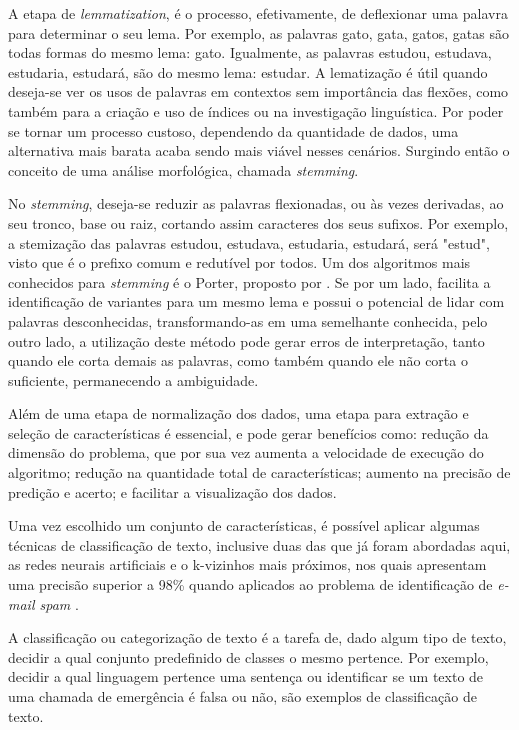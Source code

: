 A etapa de \textit{lemmatization}, é o processo, efetivamente, de deflexionar uma palavra para determinar o seu lema. Por exemplo, as palavras gato, gata, gatos, gatas são todas formas do mesmo lema: gato. Igualmente, as palavras estudou, estudava, estudaria, estudará, são do mesmo lema: estudar. A lematização é útil quando deseja-se ver os usos de palavras em contextos sem importância das flexões, como também para a criação e uso de índices ou na investigação linguística. Por poder se tornar um processo custoso, dependendo da quantidade de dados, uma alternativa mais barata acaba sendo mais viável nesses cenários. Surgindo então o conceito de uma análise morfológica, chamada \textit{stemming}.

No \textit{stemming}, deseja-se reduzir as palavras flexionadas, ou às vezes derivadas, ao seu tronco, base ou raiz, cortando assim caracteres dos seus sufixos. Por exemplo, a stemização das palavras estudou, estudava, estudaria, estudará, será "estud", visto que é o prefixo comum e redutível por todos. Um dos algoritmos mais conhecidos para \textit{stemming} é o Porter, proposto por \citep{porter1980algorithm}. Se por um lado, facilita a identificação de variantes para um mesmo lema e possui o potencial de lidar com palavras desconhecidas, transformando-as em uma semelhante conhecida, pelo outro lado, a utilização deste método pode gerar erros de interpretação, tanto quando ele corta demais as palavras, como também quando ele não corta o suficiente, permanecendo a ambiguidade.

Além de uma etapa de normalização dos dados, uma etapa para extração e seleção de características é essencial, e pode gerar benefícios como: redução da dimensão do problema, que por sua vez aumenta a velocidade de execução do algoritmo; redução na quantidade total de características; aumento na precisão de predição e acerto; e facilitar a visualização dos dados.

Uma vez escolhido um conjunto de características, é possível aplicar algumas técnicas de classificação de texto, inclusive duas das que já foram abordadas aqui, as redes neurais artificiais e o k-vizinhos mais próximos, nos quais apresentam uma precisão superior a 98\% quando aplicados ao problema de identificação de \textit{e-mail spam} \citep{russell1994inteligencia}.

A classificação ou categorização de texto é a tarefa de, dado algum tipo de texto, decidir a qual conjunto predefinido de classes o mesmo pertence. Por exemplo, decidir a qual linguagem pertence uma sentença ou identificar se um texto de uma chamada de emergência é falsa ou não, são exemplos de classificação de texto.